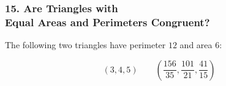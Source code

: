 \documentclass{beamer}
\newcommand*{\vertex}[1]
  {\fill[shift only] (#1) circle (1.5pt)}
\begin{document}
\begin{frame}
%
%
\end{frame}


\begin{frame}
\frametitle{15. Are Triangles with\\Equal Areas and Perimeters Congruent?}

\pause

%


\vspace{-10ex}

The following two triangles have perimeter $12$ and area $6$:

\[
(3,4,5) \qquad \displaystyle\left(\frac{156}{35}, \frac{101}{21}, \frac{41}{15}\right)
\]

\end{frame}
\end{document}

